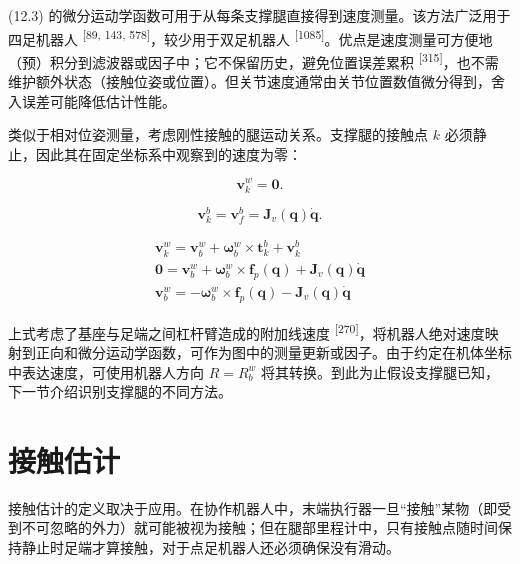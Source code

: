 (12.3) 的微分运动学函数可用于从每条支撑腿直接得到速度测量。该方法广泛用于四足机器人 \textsuperscript{[89, 143, 578]}，较少用于双足机器人 \textsuperscript{[1085]}。优点是速度测量可方便地（预）积分到滤波器或因子中；它不保留历史，避免位置误差累积 \textsuperscript{[315]}，也不需维护额外状态（接触位姿或位置）。但关节速度通常由关节位置数值微分得到，舍入误差可能降低估计性能。

类似于相对位姿测量，考虑刚性接触的腿运动关系。支撑腿的接触点 $k$ 必须静止，因此其在固定坐标系中观察到的速度为零：

\begin{equation}
\pmb {v} _ {k} ^ {w} = \mathbf {0}.\tag{12.19}
\end{equation}

\begin{equation}
\boldsymbol {v} _ {k} ^ {b} = \boldsymbol {v} _ {f} ^ {b} = \boldsymbol {J} _ {v} (\boldsymbol {q}) \dot {\boldsymbol {q}}.\tag{12.20}
\end{equation}

\begin{equation}
\begin{array}{c} \boldsymbol {v} _ {k} ^ {w} = \boldsymbol {v} _ {b} ^ {w} + \boldsymbol {\omega} _ {b} ^ {w} \times \boldsymbol {t} _ {k} ^ {b} + \boldsymbol {v} _ {k} ^ {b} \\ \boldsymbol {0} = \boldsymbol {v} _ {b} ^ {w} + \boldsymbol {\omega} _ {b} ^ {w} \times \mathbf {f} _ {p} (\boldsymbol {q}) + \boldsymbol {J} _ {v} (\boldsymbol {q}) \dot {\boldsymbol {q}} \\ \boldsymbol {v} _ {b} ^ {w} = - \boldsymbol {\omega} _ {b} ^ {w} \times \mathbf {f} _ {p} (\boldsymbol {q}) - \boldsymbol {J} _ {v} (\boldsymbol {q}) \dot {\boldsymbol {q}} \end{array}\tag{12.21}
\end{equation}

上式考虑了基座与足端之间杠杆臂造成的附加线速度 \textsuperscript{[270]}，将机器人绝对速度映射到正向和微分运动学函数，可作为图中的测量更新或因子。由于约定在机体坐标中表达速度，可使用机器人方向 $R=R_b^w$ 将其转换。到此为止假设支撑腿已知，下一节介绍识别支撑腿的不同方法。

\section{接触估计}

接触估计的定义取决于应用。在协作机器人中，末端执行器一旦“接触”某物（即受到不可忽略的外力）就可能被视为接触；但在腿部里程计中，只有接触点随时间保持静止时足端才算接触，对于点足机器人还必须确保没有滑动。

